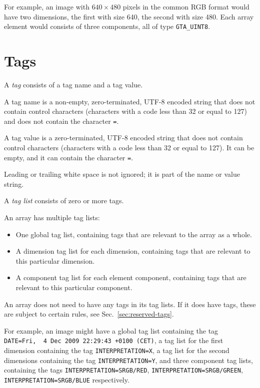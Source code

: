 \documentclass[a4paper,11pt]{article}
\newcommand{\code}[1]{\texttt{#1}}
\begin{document}
For example, an image with $640\times 480$ pixels in the common RGB format
would have two dimensions, the first with size 640, the second with size 480.
Each array element would consists of three components, all of type
\code{GTA\_UINT8}.

\section{Tags}
\label{sec:tags}

A \emph{tag} consists of a tag name and a tag value.

A tag name is a non-empty, zero-terminated, UTF-8 encoded string that does not
contain control characters (characters with a code less than 32 or equal to 127)
and does not contain the character \code{=}.

A tag value is a zero-terminated, UTF-8 encoded string that does not contain
control characters (characters with a code less than 32 or equal to 127). It can
be empty, and it can contain the character \code{=}.

Leading or trailing white space is not ignored; it is part of the name or
value string.

A \emph{tag list} consists of zero or more tags.

An array has multiple tag lists:
\begin{itemize}
\item One global tag list, containing tags that are relevant to the array as a
whole.
\item A dimension tag list for each dimension, containing tags that are
relevant to this particular dimension.
\item A component tag list for each element component, containing tags that
are relevant to this particular component.
\end{itemize}

An array does not need to have any tags in its tag lists. If it does have
tags, these are subject to certain rules, see Sec.~\ref{sec:reserved-tags}.

For example, an image might have a global tag list containing the tag
\code{DATE=Fri,~~4 Dec 2009 22:29:43 +0100 (CET)}, 
a tag list for the first dimension containing the tag \code{INTERPRETATION=X},
a tag list for the second dimensions containing the tag
\code{INTERPRETATION=Y}, and three component tag lists, containing the tags
\code{INTERPRETATION=SRGB/RED}, \code{INTERPRETATION=SRGB/GREEN},
\code{INTERPRETATION=SRGB/BLUE} respectively.
\end{document}

